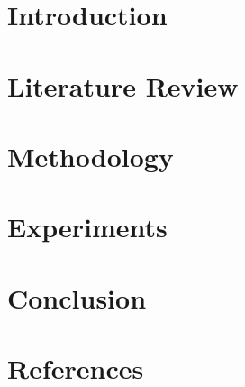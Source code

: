 \documentclass[14pt]{extreport}
\begin{document}

\begingroup\singlespacing
\tableofcontents
\endgroup
\clearpage


\chapter{Introduction}

\chapter{Literature Review}

\chapter{Methodology}

\chapter{Experiments}

\chapter{Conclusion}

\chapter{References}
\end{document}
